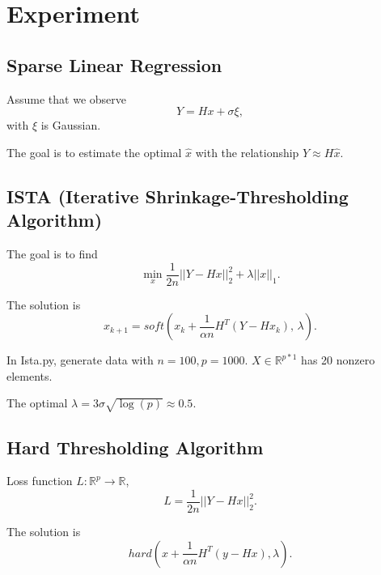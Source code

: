\documentclass[12pt,letterpaper]{article}
\begin{document}
\section{Experiment}
\subsection{Sparse Linear Regression} 

Assume that we observe $$Y = Hx + \sigma\xi,$$ with $\xi$ is Gaussian.

The goal is to estimate the optimal $\hat{x}$ with the relationship $Y \approx H \hat{x}$.

\subsection{ISTA (Iterative Shrinkage-Thresholding Algorithm)}

The goal is to find $$\min_x \frac{1}{2n}||Y - Hx||_2^2 + \lambda ||x||_1.$$

The solution is $$x_{k+1} = soft(x_k + \frac{1}{\alpha n} H^T(Y-Hx_k),\, \lambda).$$

In Ista.py, generate data with $n = 100, p = 1000$. $X \in \mathbb{R}^{p*1}$ has 20 nonzero elements.

The optimal $\lambda = 3\sigma\sqrt{\log(p)} \approx 0.5$.

\subsection{Hard Thresholding Algorithm}

Loss function $L: \mathbb{R}^p \rightarrow \mathbb{R}$, $$L = \frac{1}{2n}||Y - Hx||_2^2.$$

The solution is $$hard(x + \frac{1}{\alpha n} H^T(y-Hx), \lambda).$$
\end{document}

